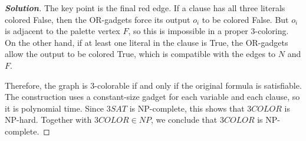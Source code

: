 \documentclass[a4paper, UTF-8]{article}
\theoremstyle{plain}
\newenvironment{solution}{\begin{proof}[\indent\bf Solution]}{\end{proof}}
\begin{document}
\begin{solution}
The key point is the final red edge. If a clause has all three literals colored
False, then the OR-gadgets force its output $o_i$ to be colored False. But
$o_i$ is adjacent to the palette vertex $F$, so this is impossible in a proper
3-coloring. On the other hand, if at least one literal in the clause is True,
the OR-gadgets allow the output to be colored True, which is compatible with
the edges to $N$ and $F$.

Therefore, the graph is 3-colorable if and only if the original formula is
satisfiable. The construction uses a constant-size gadget for each variable
and each clause, so it is polynomial time. Since $3SAT$ is NP-complete, this
shows that $3COLOR$ is NP-hard. Together with $3COLOR\in NP$, we conclude that
$3COLOR$ is NP-complete.
\end{solution}
\end{document}
